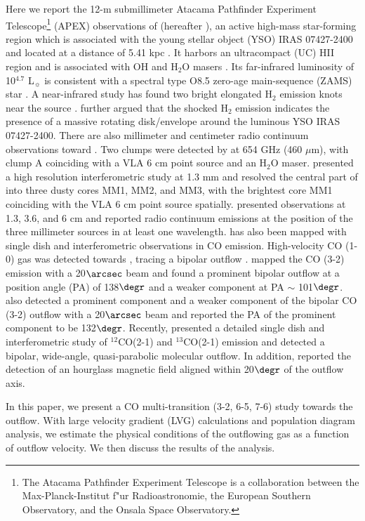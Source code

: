 Here we report the 12-m submillimeter Atacama Pathfinder Experiment Telescope\footnote{    The Atacama Pathfinder Experiment Telescope is a collaboration between the Max-Planck-Institut f"ur Radioastronomie, the European Southern Observatory, and the Onsala Space Observatory.} (APEX) observations of  (hereafter ), an active high-mass star-forming region which is associated with the young stellar object (YSO) IRAS 07427-2400 and located at a distance of 5.41 kpc \citep{2015PASJ...67...69S}. It harbors an ultracompact (UC) HII region and is associated with OH and H$_2$O masers \citep{1993AJ....105.1495H,1997MNRAS.289..203C,1998AJ....116.1897M,1999ApJS..123..487M,2003MNRAS.341..551C}. Its far-infrared luminosity of 10$^{4.7}$ L$_\sun$ is consistent with a spectral type O8.5 zero-age main-sequence (ZAMS) star \citep{1998AJ....116.1897M}. A near-infrared study has found two bright elongated H$_2$ emission knots near the source \citep{2002ApJ...576..313K}. \citet{2003A&A...412..175K} further argued that the shocked H$_2$ emission indicates the presence of a massive rotating disk/envelope around the luminous YSO IRAS 07427-2400. There are also millimeter and centimeter radio continuum observations toward . Two clumps were detected by \citet{2007ApJ...654L..87C} at 654 GHz (460 $\mu$m), with clump A coinciding with a VLA 6 cm point source \citep{1993AJ....105.1495H} and an H$_2$O maser. \citet{2009ApJ...696...66Q} presented a high resolution interferometric study at 1.3 mm and resolved the central part of  into three dusty cores MM1, MM2, and MM3, with the brightest core MM1 coinciding with the VLA 6 cm point source spatially. \citet{2011AJ....142..147T} presented observations at 1.3, 3.6, and 6 cm and reported radio continuum emissions at the position of the three millimeter sources in at least one wavelength.  has also been mapped with single dish and interferometric observations in CO emission. High-velocity CO (1-0) gas was detected towards  \citep{1991AJ....101.1435M,1996ApJ...457..267S}, tracing a bipolar outflow \citep{1996ApJ...457..267S}. \citet{1997PhDT........21H} mapped the CO (3-2) emission with a 20${\arcsec}$ beam and found a prominent bipolar outflow at a position angle (PA) of 138${\degr}$ and a weaker component at PA $\sim$ 101${\degr}$. \citet{2003A&A...412..175K} also detected a prominent component and a weaker component of the bipolar CO (3-2) outflow with a 20${\arcsec}$ beam and reported the PA of the prominent component to be 132${\degr}$. Recently, \citet{2009ApJ...696...66Q} presented a detailed single dish and interferometric study of $^{12}$CO(2-1) and $^{13}$CO(2-1) emission and detected a bipolar, wide-angle, quasi-parabolic molecular outflow. In addition, \citet{2014ApJ...794L..18Q} reported the detection of an hourglass magnetic field aligned within 20${\degr}$ of the outflow axis.

In this paper, we present a CO multi-transition (3-2, 6-5, 7-6) study towards the  outflow. With large velocity gradient (LVG) calculations and population diagram analysis, we estimate the physical conditions of the outflowing gas as a function of outflow velocity. We then discuss the results of the analysis.


